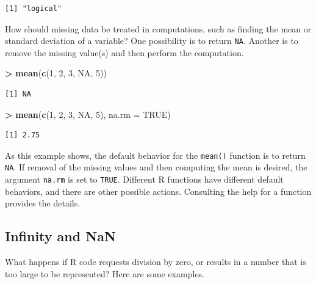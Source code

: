 \documentclass[]{krantz}
\makeatletter
\newenvironment{Shaded}{\begin{snugshade}}{\end{snugshade}}
\newcommand{\KeywordTok}[1]{\textcolor[rgb]{0.27,0.27,0.27}{\textbf{#1}}}
\newcommand{\DataTypeTok}[1]{\textcolor[rgb]{0.27,0.27,0.27}{#1}}
\newcommand{\DecValTok}[1]{\textcolor[rgb]{0.06,0.06,0.06}{#1}}
\newcommand{\StringTok}[1]{\textcolor[rgb]{0.5,0.5,0.5}{#1}}
\newcommand{\OtherTok}[1]{\textcolor[rgb]{0.37,0.37,0.37}{#1}}
\newcommand{\OperatorTok}[1]{\textcolor[rgb]{0.43,0.43,0.43}{\textbf{#1}}}
\newcommand{\NormalTok}[1]{#1}
\newenvironment{kframe}{%
\medskip{}
\setlength{\fboxsep}{.8em}
 \def\at@end@of@kframe{}%
 \ifinner\ifhmode%
  \def\at@end@of@kframe{\end{minipage}}%
  \begin{minipage}{\columnwidth}%
 \fi\fi%
 \def\FrameCommand##1{\hskip\@totalleftmargin \hskip-\fboxsep
 \colorbox{shadecolor}{##1}\hskip-\fboxsep
     \hskip-\linewidth \hskip-\@totalleftmargin \hskip\columnwidth}%
 \MakeFramed {\advance\hsize-\width
   \@totalleftmargin\z@ \linewidth\hsize
   \@setminipage}}%
 {\par\unskip\endMakeFramed%
 \at@end@of@kframe}
\renewenvironment{Shaded}{\begin{kframe}}{\end{kframe}}
\theoremstyle{definition}
\theoremstyle{definition}
\theoremstyle{definition}
\theoremstyle{remark}
\makeatother
\begin{document}
\begin{verbatim}
[1] "logical"
\end{verbatim}

How should missing data be treated in computations, such as finding the
mean or standard deviation of a variable? One possibility is to return
\texttt{NA}. Another is to remove the missing value(s) and then perform
the computation.

\begin{Shaded}
\begin{Highlighting}[]
\OperatorTok{>}\StringTok{ }\KeywordTok{mean}\NormalTok{(}\KeywordTok{c}\NormalTok{(}\DecValTok{1}\NormalTok{, }\DecValTok{2}\NormalTok{, }\DecValTok{3}\NormalTok{, }\OtherTok{NA}\NormalTok{, }\DecValTok{5}\NormalTok{))}
\end{Highlighting}
\end{Shaded}

\begin{verbatim}
[1] NA
\end{verbatim}

\begin{Shaded}
\begin{Highlighting}[]
\OperatorTok{>}\StringTok{ }\KeywordTok{mean}\NormalTok{(}\KeywordTok{c}\NormalTok{(}\DecValTok{1}\NormalTok{, }\DecValTok{2}\NormalTok{, }\DecValTok{3}\NormalTok{, }\OtherTok{NA}\NormalTok{, }\DecValTok{5}\NormalTok{), }\DataTypeTok{na.rm =} \OtherTok{TRUE}\NormalTok{)}
\end{Highlighting}
\end{Shaded}

\begin{verbatim}
[1] 2.75
\end{verbatim}

As this example shows, the default behavior for the \texttt{mean()}
function is to return \texttt{NA}. If removal of the missing values and
then computing the mean is desired, the argument \texttt{na.rm} is set
to \texttt{TRUE}. Different R functions have different default
behaviors, and there are other possible actions. Consulting the help for
a function provides the details.

\subsection{Infinity and NaN}\label{infinity-and-nan}

What happens if R code requests division by zero, or results in a number
that is too large to be represented? Here are some examples.
\end{document}
